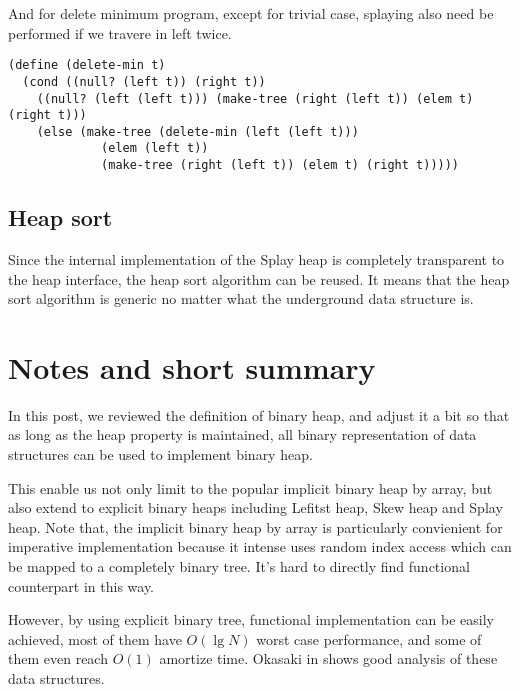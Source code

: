 \documentclass{article}
\begin{document}
And for delete minimum program, except for trivial case, splaying also
need be performed if we travere in left twice.

\begin{lstlisting}
(define (delete-min t)
  (cond ((null? (left t)) (right t))
	((null? (left (left t))) (make-tree (right (left t)) (elem t) (right t)))
	(else (make-tree (delete-min (left (left t)))
			 (elem (left t))
			 (make-tree (right (left t)) (elem t) (right t)))))
\end{lstlisting}

\subsection{Heap sort}

Since the internal implementation of the Splay heap is completely
transparent to the heap interface, the heap sort algorithm can
be reused. It means that the heap sort algorithm is generic no
matter what the underground data structure is.

\section{Notes and short summary}

In this post, we reviewed the definition of binary heap, and adjust it
a bit so that as long as the heap property is maintained, all binary
representation of data structures can be used to implement binary heap.

This enable us not only limit to the popular implicit binary heap
by array, but also extend to explicit binary heaps including Lefitst
heap, Skew heap and Splay heap. Note that, the implicit binary heap
by array is particularly convienient for imperative implementation
because it intense uses random index access which can be mapped to
a completely binary tree. It's hard to directly find functional
counterpart in this way. 

However, by using explicit binary tree, functional implementation
can be easily achieved, most of them have $O(\lg N)$ worst case 
performance, and some of them even reach $O(1)$ amortize time.
Okasaki in \cite{okasaki-book} shows good analysis of these data
structures.
\end{document}
